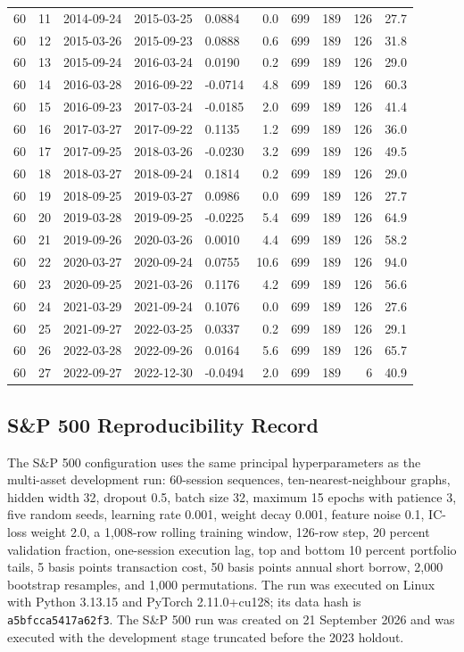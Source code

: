 \documentclass[10pt]{article}
\begin{document}
\begin{longtable}{rrrrlrrrrr}
60 & 11 & 2014-09-24 & 2015-03-25 & 0.0884 & 0.0 & 699 & 189 & 126 & 27.7 \\
60 & 12 & 2015-03-26 & 2015-09-23 & 0.0888 & 0.6 & 699 & 189 & 126 & 31.8 \\
60 & 13 & 2015-09-24 & 2016-03-24 & 0.0190 & 0.2 & 699 & 189 & 126 & 29.0 \\
60 & 14 & 2016-03-28 & 2016-09-22 & -0.0714 & 4.8 & 699 & 189 & 126 & 60.3 \\
60 & 15 & 2016-09-23 & 2017-03-24 & -0.0185 & 2.0 & 699 & 189 & 126 & 41.4 \\
60 & 16 & 2017-03-27 & 2017-09-22 & 0.1135 & 1.2 & 699 & 189 & 126 & 36.0 \\
60 & 17 & 2017-09-25 & 2018-03-26 & -0.0230 & 3.2 & 699 & 189 & 126 & 49.5 \\
60 & 18 & 2018-03-27 & 2018-09-24 & 0.1814 & 0.2 & 699 & 189 & 126 & 29.0 \\
60 & 19 & 2018-09-25 & 2019-03-27 & 0.0986 & 0.0 & 699 & 189 & 126 & 27.7 \\
60 & 20 & 2019-03-28 & 2019-09-25 & -0.0225 & 5.4 & 699 & 189 & 126 & 64.9 \\
60 & 21 & 2019-09-26 & 2020-03-26 & 0.0010 & 4.4 & 699 & 189 & 126 & 58.2 \\
60 & 22 & 2020-03-27 & 2020-09-24 & 0.0755 & 10.6 & 699 & 189 & 126 & 94.0 \\
60 & 23 & 2020-09-25 & 2021-03-26 & 0.1176 & 4.2 & 699 & 189 & 126 & 56.6 \\
60 & 24 & 2021-03-29 & 2021-09-24 & 0.1076 & 0.0 & 699 & 189 & 126 & 27.6 \\
60 & 25 & 2021-09-27 & 2022-03-25 & 0.0337 & 0.2 & 699 & 189 & 126 & 29.1 \\
60 & 26 & 2022-03-28 & 2022-09-26 & 0.0164 & 5.6 & 699 & 189 & 126 & 65.7 \\
60 & 27 & 2022-09-27 & 2022-12-30 & -0.0494 & 2.0 & 699 & 189 & 6 & 40.9 \\
\bottomrule
\end{longtable}
\endgroup

\subsection{S\&P 500 Reproducibility Record}

The S\&P 500 configuration uses the same principal hyperparameters as the multi-asset development run: 60-session sequences, ten-nearest-neighbour graphs, hidden width 32, dropout 0.5, batch size 32, maximum 15 epochs with patience 3, five random seeds, learning rate 0.001, weight decay 0.001, feature noise 0.1, IC-loss weight 2.0, a 1,008-row rolling training window, 126-row step, 20 percent validation fraction, one-session execution lag, top and bottom 10 percent portfolio tails, 5 basis points transaction cost, 50 basis points annual short borrow, 2,000 bootstrap resamples, and 1,000 permutations. The run was executed on Linux with Python 3.13.15 and PyTorch 2.11.0+cu128; its data hash is \texttt{a5bfcca5417a62f3}. The S\&P 500 run was created on 21 September 2026 and was executed with the development stage truncated before the 2023 holdout.
\end{document}
